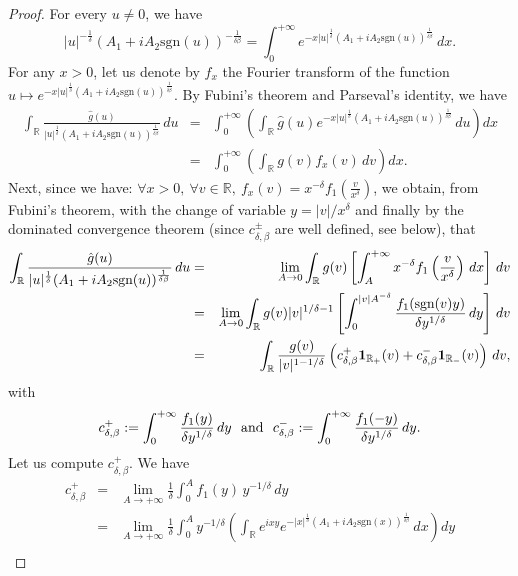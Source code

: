 \documentclass[oneside, a4paper,11pt,reqno]{amsart}
\begin{document}
\begin{proof}
For every $u\ne 0$, we have $$|u|^{-\frac 1\delta} (A_1+iA_2\text{sgn}(u))^{-\frac 1{\delta\beta}}= \int_0^{+\infty}
   e^{-x|u|^{\frac1{\delta}}(A_1+iA_2\text{sgn}(u))^{\frac 1{\delta\beta}}}\, dx.$$ 
For any $x>0$, let us denote by $f_x$ the Fourier transform of the function
$u\mapsto e^{-x|u|^{\frac 1\delta}(A_1+iA_2\text{sgn}(u))^{\frac 1{\delta\beta}}}$. 
By Fubini's theorem and Parseval's identity, we have
\begin{eqnarray*}
\int_{\mathbb R} \frac{\hat g(u)}{|u|^{\frac 1\delta}(A_1+iA_2\text{sgn}(u))^{\frac 1{\delta\beta}}}\, du
    &=&  \int_0^{+\infty}\left(\int_{\mathbb R} \hat g(u) e^{-x|u|^{\frac1{\delta}}(A_1+iA_2\text{sgn}(u))^{\frac 1{\delta\beta}}} \, du\right)dx \\
    &=& \int_0^{+\infty}\left(\int_{\mathbb R}g(v) f_x (v)\, dv\right) dx.
\end{eqnarray*}
Next, since we have: $\forall x>0,\ \forall v\in{\mathbb R},\ f_x(v)
        = x^{-\delta} f_1\left(\frac{v}{x^\delta}\right)$, 
we obtain, from Fubini's theorem, with the change of variable $y=|v|/x^\delta$ and
finally by the dominated convergence theorem (since $c_{\delta,\beta}^\pm$ are
well defined, see below), that
\begin{eqnarray*}
\int_{\mathbb R}\frac{\hat g(u)}{|u|^{\frac 1\delta}(A_1+iA_2\text{sgn}(u))^{\frac 1{\delta\beta}}}\, du
 &=& \lim_{A\rightarrow 0}\int_{\mathbb R} g(v) \left[\int_A^{+\infty} x^{-\delta} f_1
   \left(\frac{v}{x^\delta}\right)\, dx\right]\, dv\\
 &=& \lim_{A\rightarrow 0}\int_{\mathbb R} g(v) |v|^{1/\delta-1} 
     \left[\int_0^{|v|A^{-\delta}}\frac{f_1(\textrm{sgn}(v)y)}{\delta y^{1/\delta}}\, dy\right]\, dv\\
     &=& \int_{\mathbb R}\frac{g(v)}{|v|^{1-1/\delta}}\left(c_{\delta,\beta}^+{\bf 1}_{{\mathbb{R}}_+}(v) + c_{\delta,\beta}^{-} {\bf 1}_{{\mathbb{R}}_-}(v)\right) \, dv,
\end{eqnarray*}
with 
$$c_{\delta,\beta}^{+}:= \int_0^{+\infty}\frac{f_1(y)}{\delta y^{1/\delta}}\, dy\ \ \mbox{\rm and}\ 
\ c_{\delta,\beta}^{-}:= \int_0^{+\infty}\frac{f_1(-y)}{\delta y^{1/\delta}}\, dy.$$
Let us compute $c_{\delta,\beta}^{+}$. We have
\begin{eqnarray*}
c_{\delta,\beta}^+ &= &\lim_{A\rightarrow +\infty}\frac{1}{\delta} 
    \int_0^{A} f_1(y)\, y^{-1/\delta}\, dy\\
&=& \lim_{A\rightarrow +\infty} \frac{1}{\delta} \int_0^{A} y^{-1/\delta} \left(\int_{\mathbb R}  e^{ixy}   e^{-|x|^{\frac{1}{\delta}} (A_1+iA_2\text{sgn}(x))^{\frac{1}{\delta\beta}}} \, dx \right) dy \\

\end{eqnarray*}
\end{proof}
\end{document}
